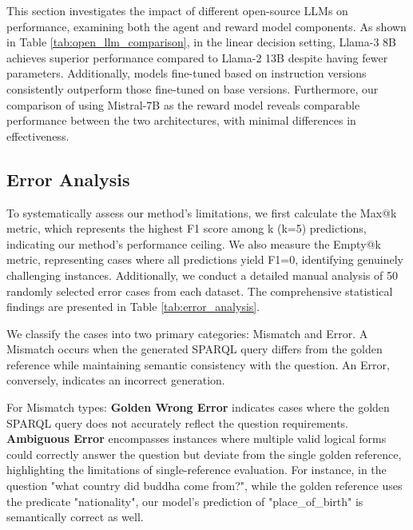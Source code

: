 This section investigates the impact of different open-source LLMs on performance, examining both the agent and reward model components. 
As shown in Table \ref{tab:open_llm_comparison}, in the linear decision setting, Llama-3 8B achieves superior performance compared to Llama-2 13B despite having fewer parameters. 
Additionally, models fine-tuned based on instruction versions consistently outperform those fine-tuned on base versions.
Furthermore, our comparison of using Mistral-7B as the reward model reveals comparable performance between the two architectures, with minimal differences in effectiveness.


\subsection{Error Analysis}

To systematically assess our method's limitations, we first calculate the Max@k metric, which represents the highest F1 score among k (k=5) predictions, indicating our method's performance ceiling. We also measure the Empty@k metric, representing cases where all predictions yield F1=0, identifying genuinely challenging instances.
Additionally, we conduct a detailed manual analysis of 50 randomly selected error cases from each dataset.
The comprehensive statistical findings are presented in Table \ref{tab:error_analysis}.

We classify the cases into two primary categories: Mismatch and Error. A Mismatch occurs when the generated SPARQL query differs from the golden reference while maintaining semantic consistency with the question. An Error, conversely, indicates an incorrect generation.

For Mismatch types:
\textbf{Golden Wrong Error} indicates cases where the golden SPARQL query does not accurately reflect the question requirements.
\textbf{Ambiguous Error} encompasses instances where multiple valid logical forms could correctly answer the question but deviate from the single golden reference, highlighting the limitations of single-reference evaluation.
For instance, in the question "what country did buddha come from?", while the golden reference uses the predicate "nationality", our model's prediction of "place\_of\_birth" is semantically correct as well.

